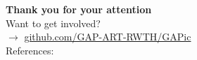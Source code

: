 \documentclass{beamer}
\numberwithin{equation}{aufgabe}
\begin{document}
\begin{frame}
    \textbf{\Large Thank you for your attention}\\ 
    \bigskip
    Want to get involved?\\ 
    $\xrightarrow{}$ \url{github.com/GAP-ART-RWTH/GAPic}\\
    \bigskip
    References:\\
    \printbibliography
\end{frame}
\end{document}
